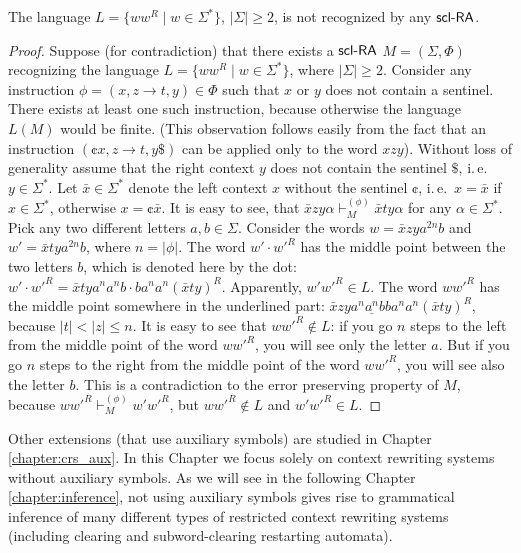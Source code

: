 \begin{theorem}[\citep{C13}]
The language $L = \{ w w^R \mid w \in \Sigma^* \}$, $|\Sigma| \ge 2$, is not recognized by any $\textup{\sf scl-RA}$.
\end{theorem}

\begin{proof}
Suppose (for contradiction) that there exists a $\textup{\sf scl-RA}$ $M = (\Sigma, \Phi)$  recognizing the language $L = \{ w w^R \mid w \in \Sigma^* \}$, where $|\Sigma| \ge 2$. Consider any instruction $\phi = (x, z \to t, y) \in \Phi$ such that $x$ or $y$ does not contain a sentinel. There exists at least one such instruction, because otherwise the language $L(M)$ would be finite. (This observation follows easily from the fact that an instruction  $(\cent x, z \to t, y\$)$ can be applied only to the word $xzy$). Without loss of generality assume that the right context $y$ does not contain the sentinel $\$$, i.\,e.\, $y \in \Sigma^*$. Let $\bar{x} \in \Sigma^*$ denote the left context $x$ without the sentinel $\cent$, i.\,e.\, $x = \bar{x}$ if $x \in \Sigma^*$, otherwise $x = \cent \bar{x}$. It is easy to see, that $\bar{x} z y \alpha \vdash_M^{(\phi)} \bar{x} t y \alpha$ for any $\alpha \in \Sigma^*$. Pick any two different letters $a, b \in \Sigma$. Consider the words $w = \bar{x} z y a^{2n} b$ and $w' = \bar{x} t y a^{2n} b$, where $n = |\phi|$. The word $w' \cdot w'^R$ has the middle point between the two letters $b$, which is denoted here by the dot: $w' \cdot w'^R = \bar{x} t y a^n a^n b \cdot b a^n a^n (\bar{x} t y)^R$. Apparently, $w' w'^R \in L$. The word $w w'^R$ has the middle point somewhere in the underlined part: $\bar{x} z y a^n \underline{a^n} b b a^n a^n (\bar{x} t y)^R$, because $|t| < |z| \le n$. It is easy to see that $w w'^R \notin L$: if you go $n$ steps to the left from the middle point of the word $w w'^R$, you will see only the letter $a$. But if you go $n$ steps to the right from the middle point of the word $w w'^R$, you will see also the letter $b$. This is a contradiction to the error preserving property of $M$, because $w w'^R \vdash_M^{(\phi)} w' w'^R$, but $w w'^R \notin L$ and $w' w'^R \in L$.
\end{proof}

Other extensions (that use auxiliary symbols) are studied in Chapter \ref{chapter:crs_aux}. In this Chapter we focus solely on context rewriting systems without auxiliary symbols. As we will see in the following Chapter \ref{chapter:inference}, not using auxiliary symbols gives rise to grammatical inference of many different types of restricted context rewriting systems (including clearing and subword-clearing restarting automata).
